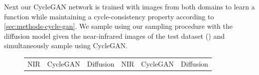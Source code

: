 Next our CycleGAN network is trained with images from both domains to learn a function while maintaining a cycle-consistency property according to \autoref{sec:methods-cycle-gan}.
We sample using our sampling procedure with the diffusion model given the near-infrared images of the test dataset (\todo{}) and simultaneously
sample using CycleGAN.

\begin{figure}[htp!]
    \centering
    \begin{tabularx}{\textwidth}{Y Y Y !{\space} Y Y Y}
        NIR                                                                                                            & CycleGAN                                                                                                                 & Diffusion                                                                                                            & NIR                                                                                                            & CycleGAN                                                                                                                 & Diffusion                                                                                                            \\

\end{tabularx}
\end{figure}
